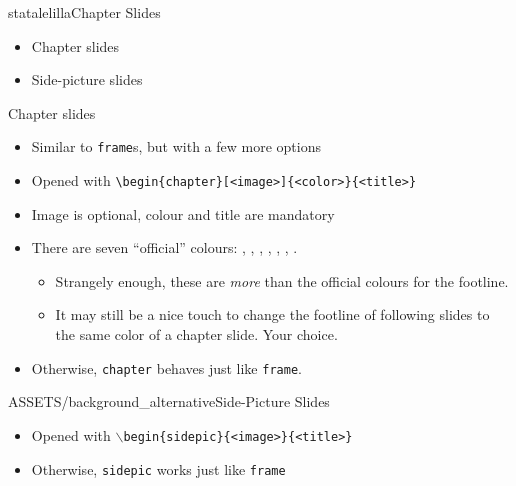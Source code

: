 \begin{chapter}{statalelilla}{Chapter Slides}
\begin{itemize}
    \item Chapter slides
    \item Side-picture slides
\end{itemize}
\end{chapter}


\begin{frame}[fragile]{Chapter slides}
\begin{itemize}
    \item Similar to \verb|frame|s, but with a few more options
    \item Opened with \verb|\begin{chapter}[<image>]{<color>}{<title>}|
    \item Image is optional, colour and title are mandatory
    \item There are seven ``official'' colours: , , , , , , .
    \begin{itemize}
        \item Strangely enough, these are \emph{more} than the official colours for the footline.
        \item It may still be a nice touch to change the footline of following  slides to the same color of a chapter slide. Your choice.
    \end{itemize}
    \item Otherwise, \verb|chapter| behaves just like \verb|frame|.
\end{itemize}
\end{frame}


\begin{sidepic}{ASSETS/background_alternative}{Side-Picture Slides}
\begin{itemize}
    \item Opened with \texttt{$\backslash$begin\{sidepic\}\{<image>\}\{<title>\}}
    \item Otherwise, \texttt{sidepic} works just like \texttt{frame}
\end{itemize}
\end{sidepic}

